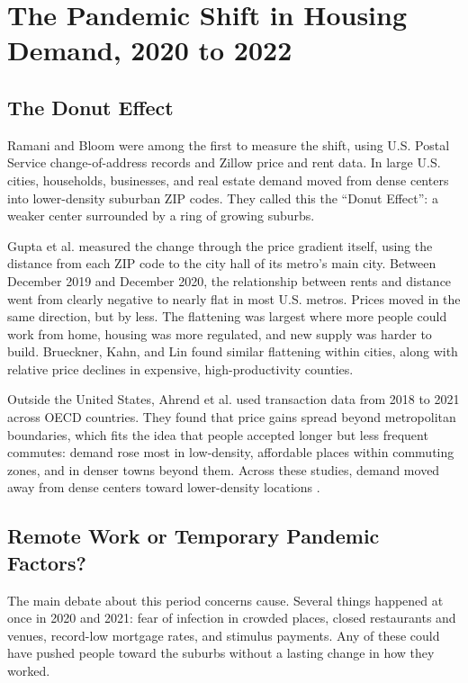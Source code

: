 \documentclass[11pt]{article}
\begin{document}
\section{The Pandemic Shift in Housing Demand, 2020 to 2022}

\subsection{The Donut Effect}

Ramani and Bloom \cite{ramani2021donut} were among the first to measure the shift, using U.S. Postal Service change-of-address records and Zillow price and rent data. In large U.S. cities, households, businesses, and real estate demand moved from dense centers into lower-density suburban ZIP codes. They called this the ``Donut Effect'': a weaker center surrounded by a ring of growing suburbs.

Gupta et al. \cite{gupta2022flattening} measured the change through the price gradient itself, using the distance from each ZIP code to the city hall of its metro's main city. Between December 2019 and December 2020, the relationship between rents and distance went from clearly negative to nearly flat in most U.S. metros. Prices moved in the same direction, but by less. The flattening was largest where more people could work from home, housing was more regulated, and new supply was harder to build. Brueckner, Kahn, and Lin \cite{brueckner2023spatial} found similar flattening within cities, along with relative price declines in expensive, high-productivity counties.

Outside the United States, Ahrend et al. \cite{ahrend2023expanding} used transaction data from 2018 to 2021 across OECD countries. They found that price gains spread beyond metropolitan boundaries, which fits the idea that people accepted longer but less frequent commutes: demand rose most in low-density, affordable places within commuting zones, and in denser towns beyond them. Across these studies, demand moved away from dense centers toward lower-density locations \cite{brueckner2023spatial,ramani2021donut,gupta2022flattening,ahrend2023expanding}.

\subsection{Remote Work or Temporary Pandemic Factors?}

The main debate about this period concerns cause. Several things happened at once in 2020 and 2021: fear of infection in crowded places, closed restaurants and venues, record-low mortgage rates, and stimulus payments. Any of these could have pushed people toward the suburbs without a lasting change in how they worked.
\end{document}
